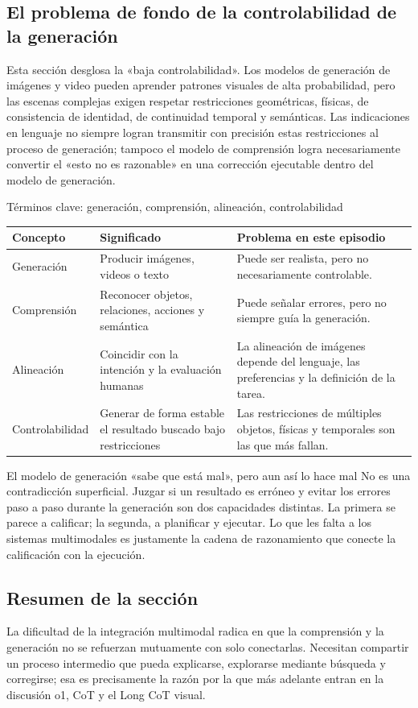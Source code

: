 \subsection{El problema de fondo de la controlabilidad de la generación}

Esta sección desglosa la «baja controlabilidad». Los modelos de generación de imágenes y video pueden aprender patrones visuales de alta probabilidad, pero las escenas complejas exigen respetar restricciones geométricas, físicas, de consistencia de identidad, de continuidad temporal y semánticas. Las indicaciones en lenguaje no siempre logran transmitir con precisión estas restricciones al proceso de generación; tampoco el modelo de comprensión logra necesariamente convertir el «esto no es razonable» en una corrección ejecutable dentro del modelo de generación.

\begin{knowledgebox}{Términos clave: generación, comprensión, alineación, controlabilidad}
\noindent\begin{tabularx}{\textwidth}{p{}p{}X}
\toprule
Concepto & Significado & Problema en este episodio \\
\midrule
Generación & Producir imágenes, videos o texto & Puede ser realista, pero no necesariamente controlable. \\
Comprensión & Reconocer objetos, relaciones, acciones y semántica & Puede señalar errores, pero no siempre guía la generación. \\
Alineación & Coincidir con la intención y la evaluación humanas & La alineación de imágenes depende del lenguaje, las preferencias y la definición de la tarea. \\
Controlabilidad & Generar de forma estable el resultado buscado bajo restricciones & Las restricciones de múltiples objetos, físicas y temporales son las que más fallan. \\
\bottomrule
\end{tabularx}
\end{knowledgebox}

\begin{warningbox}{El modelo de generación «sabe que está mal», pero aun así lo hace mal}
No es una contradicción superficial. Juzgar si un resultado es erróneo y evitar los errores paso a paso durante la generación son dos capacidades distintas. La primera se parece a calificar; la segunda, a planificar y ejecutar. Lo que les falta a los sistemas multimodales es justamente la cadena de razonamiento que conecte la calificación con la ejecución.
\end{warningbox}

\subsection{Resumen de la sección}

La dificultad de la integración multimodal radica en que la comprensión y la generación no se refuerzan mutuamente con solo conectarlas. Necesitan compartir un proceso intermedio que pueda explicarse, explorarse mediante búsqueda y corregirse; esa es precisamente la razón por la que más adelante entran en la discusión o1, CoT y el Long CoT visual.
